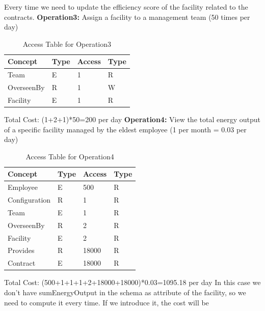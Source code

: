 \noindent Every time we need to update the efficiency score of the facility related to the contracts.
\newline
\noindent \textbf{Operation3:} Assign a facility to a management team (50 times per day)\\
\begin{table}[H]
    \renewcommand{\arraystretch}{1.3} %
    \begin{tabularx}{\textwidth}{|X|X|X|X|}
    \hline
    \textbf{Concept}& \textbf{Type}  & \textbf{Access}    & \textbf{Type}     \\ \hline
    Team & E & 1 & R \\ \hline
    OverseenBy & R & 1 & W \\ \hline
    Facility & E & 1 & R \\ \hline
    \end{tabularx}
    \caption{Access Table for Operation3}
\end{table}
\noindent Total Cost: (1+2+1)*50=200 per day
\newline
\noindent \textbf{Operation4:} View the total energy output of a specific facility managed by the eldest employee (1 per month = 0.03 per day)\\
\begin{table}[H]
    \renewcommand{\arraystretch}{1.3} %
    \begin{tabularx}{\textwidth}{|X|X|X|X|}
    \hline
    \textbf{Concept}& \textbf{Type}  & \textbf{Access}    & \textbf{Type}     \\ \hline
    Employee & E & 500 & R \\ \hline
    Configuration & R & 1 & R \\ \hline
    Team & E & 1 & R \\ \hline
    OverseenBy & R & 2 & R \\ \hline
    Facility & E & 2 & R \\ \hline
    Provides & R & 18000 & R \\ \hline
    Contract & E & 18000 & R \\ \hline
    \end{tabularx}
    \caption{Access Table for Operation4}
\end{table}
\noindent Total Cost: (500+1+1+1+2+18000+18000)*0.03=1095.18 per day
\newline
\noindent In this case we don't have sumEnergyOutput in the schema as attribute of the facility, so we need to compute it every time. If we introduce it, the cost will be
